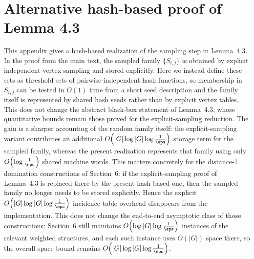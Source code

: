 \section{Alternative hash-based proof of Lemma 4.3}\label{app:restore-by-sampling-hash}

This appendix gives a hash-based realization of the sampling step in
Lemma~4.3.
In the proof from the main text, the sampled family $\{S_{i,j}\}$ is obtained
by explicit independent vertex sampling and stored explicitly.
Here we instead define these sets as threshold sets of pairwise-independent
hash functions, so membership in $S_{i,j}$ can be tested in $O(1)$ time from a
short seed description and the family itself is represented by shared hash
seeds rather than by explicit vertex tables.
This does not change the abstract black-box statement of Lemma~4.3, whose
quantitative bounds remain those proved for the explicit-sampling reduction.
The gain is a sharper accounting of the random family itself: the
explicit-sampling variant contributes an additional
$O\!\left(|G|\log|G|\log\frac{1}{\eps}\right)$ storage term for the sampled
family, whereas the present realization represents that family using only
$O\!\left(\log\frac{1}{\eps}\right)$ shared machine words.
This matters concretely for the distance-1 domination constructions of
Section~6: if the explicit-sampling proof of Lemma~4.3 is replaced there by the
present hash-based one, then the sampled family no longer needs to be stored
explicitly.
Hence the explicit
$O\!\left(|G|\log|G|\log\frac{1}{\eps}\right)$ incidence-table overhead
disappears from the implementation.
This does not change the end-to-end asymptotic class of those constructions:
Section~6 still maintains $O\!\left(\log|G|\log\frac{1}{\eps}\right)$
instances of the relevant weighted structures, and each such instance uses
$O(|G|)$ space there, so the overall space bound remains
$O\!\left(|G|\log|G|\log\frac{1}{\eps}\right)$.

